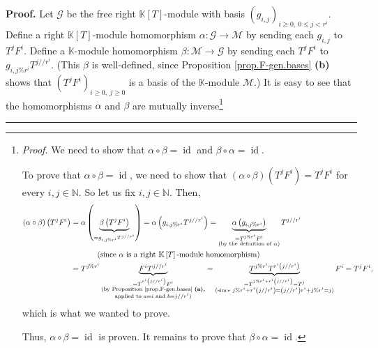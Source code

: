 \documentclass[numbers=enddot,12pt,final,onecolumn,notitlepage]{scrartcl}%
\theoremstyle{definition}
\newenvironment{proof}[1][Proof]{\noindent\textbf{#1.} }{\ \rule{0.5em}{0.5em}}
\begin{document}
\begin{proof}
Let $\mathcal{G}$ be the free right $\mathbb{K}\left[  T\right]  $-module with
basis $\left(  g_{i,j}\right)  _{i\geq0,\ 0\leq j<r^{i}}$. Define a right
$\mathbb{K}\left[  T\right]  $-module homomorphism $\alpha:\mathcal{G}%
\rightarrow\mathcal{M}$ by sending each $g_{i,j}$ to $T^{j}F^{i}$. Define a
$\mathbb{K}$-module homomorphism $\beta:\mathcal{M}\rightarrow\mathcal{G}$ by
sending each $T^{j}F^{i}$ to $g_{i,j\%r^{i}}T^{j//r^{i}}$. (This $\beta$ is
well-defined, since Proposition \ref{prop.F-gen.bases} \textbf{(b)} shows that
$\left(  T^{j}F^{i}\right)  _{i\geq0,\ j\geq0}$ is a basis of the $\mathbb{K}%
$-module $\mathcal{M}$.) It is easy to see that the homomorphisms $\alpha$ and
$\beta$ are mutually inverse\footnote{\textit{Proof.} We need to show that
$\alpha\circ\beta=\operatorname*{id}$ and $\beta\circ\alpha=\operatorname*{id}%
$.
\par
To prove that $\alpha\circ\beta=\operatorname*{id}$, we need to show that
$\left(  \alpha\circ\beta\right)  \left(  T^{j}F^{i}\right)  =T^{j}F^{i}$ for
every $i,j\in\mathbb{N}$. So let us fix $i,j\in\mathbb{N}$. Then,%
\begin{align*}
\left(  \alpha\circ\beta\right)  \left(  T^{j}F^{i}\right)   &  =\alpha\left(
\underbrace{\beta\left(  T^{j}F^{i}\right)  }_{=g_{i,j\%r^{i}}T^{j//r^{i}}%
}\right)  =\alpha\left(  g_{i,j\%r^{i}}T^{j//r^{i}}\right)
=\underbrace{\alpha\left(  g_{i,j\%r^{i}}\right)  }_{\substack{=T^{j\%r^{i}%
}F^{i}\\\text{(by the definition of }\alpha\text{)}}}T^{j//r^{i}}\\
&  \ \ \ \ \ \ \ \ \ \ \left(  \text{since }\alpha\text{ is a right
}\mathbb{K}\left[  T\right]  \text{-module homomorphism}\right) \\
&  =T^{j\%r^{i}}\underbrace{F^{i}T^{j//r^{i}}}_{\substack{=T^{r^{i}\left(
j//r^{i}\right)  }F^{i}\\\text{(by Proposition \ref{prop.F-gen.bases}
\textbf{(a),}}\\\text{applied to }a=i\text{ and }b=j//r^{i}\text{)}%
}}=\underbrace{T^{j\%r^{i}}T^{r^{i}\left(  j//r^{i}\right)  }}%
_{\substack{=T^{j\%r^{i}+r^{i}\left(  j//r^{i}\right)  }=T^{j}\\\text{(since
}j\%r^{i}+r^{i}\left(  j//r^{i}\right)  =\left(  j//r^{i}\right)
r^{i}+j\%r^{i}=j\text{)}}}F^{i}=T^{j}F^{i},
\end{align*}
which is what we wanted to prove.
\par
Thus, $\alpha\circ\beta=\operatorname*{id}$ is proven. It remains to prove
that $\beta\circ\alpha=\operatorname*{id}$.
}
\end{proof}
\end{document}

